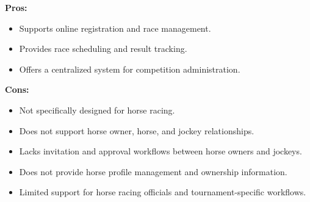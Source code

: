\textbf{Pros:}
\begin{itemize}
    \item Supports online registration and race management.
    \item Provides race scheduling and result tracking.
    \item Offers a centralized system for competition administration.
\end{itemize}

\textbf{Cons:}
\begin{itemize}
    \item Not specifically designed for horse racing.
    \item Does not support horse owner, horse, and jockey relationships.
    \item Lacks invitation and approval workflows between horse owners and jockeys.
    \item Does not provide horse profile management and ownership information.
    \item Limited support for horse racing officials and tournament-specific workflows.
\end{itemize}

